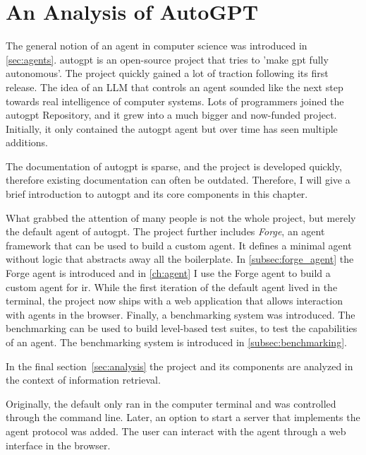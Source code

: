 \documentclass[../main.tex]{subfiles}
\begin{document}
\chapter{An Analysis of AutoGPT}
\label{ch:autogpt}

The general notion of an agent in computer science was introduced in \autoref{sec:agents}.
\gls{autogpt} is an open-source project that tries to 'make \gls{gpt} fully autonomous'.
The project quickly gained a lot of traction
following its first release.
The idea of an LLM that controls an agent sounded like the next step towards
real intelligence of computer systems.
Lots of programmers joined the \gls{autogpt} Repository,
and it grew into a much bigger and now-funded project.
Initially, it only contained the \gls{autogpt} agent
but over time has seen multiple additions.

The documentation of \gls{autogpt} is sparse,
and the project is developed quickly,
therefore existing documentation
can often be outdated.
Therefore, I will give a brief introduction to \gls{autogpt} and its core components
in this chapter.

What grabbed the attention of many people is not the whole project,
but merely the default agent of \gls{autogpt}.
The project further includes \emph{Forge},
an agent framework that can be used to build a custom agent.
It defines a minimal agent without logic
that abstracts away all the boilerplate.
In \autoref{subsec:forge_agent} the Forge agent is introduced
and in \autoref{ch:agent} I use the Forge agent
to build a custom agent for \gls{ir}.
While the first iteration of the default agent lived in the terminal,
the project now ships with a web application
that allows interaction with agents in the browser.
Finally, a benchmarking system was introduced.
The benchmarking can be used to build level-based test suites,
to test the capabilities of an agent.
The benchmarking system is introduced in \autoref{subsec:benchmarking}.

In the final section~\ref{sec:analysis} the project and its components
are analyzed in the context of information retrieval.

Originally,
the default only ran in the computer terminal
and was controlled through the command line.
Later, an option to start a server that implements the agent protocol was added.
The user can interact with the agent through a web interface in the browser.
\end{document}
